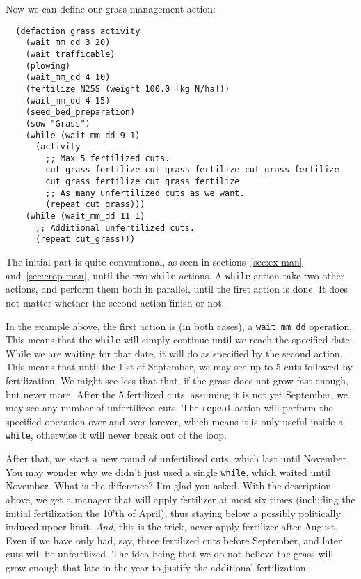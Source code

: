 \documentclass[a4paper,11pt]{article}
\begin{document}
Now we can define our grass management action:
\begin{verbatim}
  (defaction grass activity
    (wait_mm_dd 3 20)
    (wait trafficable)
    (plowing)
    (wait_mm_dd 4 10)
    (fertilize N25S (weight 100.0 [kg N/ha]))
    (wait_mm_dd 4 15)
    (seed_bed_preparation)
    (sow "Grass")
    (while (wait_mm_dd 9 1)
      (activity
        ;; Max 5 fertilized cuts.
        cut_grass_fertilize cut_grass_fertilize cut_grass_fertilize
        cut_grass_fertilize cut_grass_fertilize
        ;; As many unfertilized cuts as we want.
        (repeat cut_grass)))
    (while (wait_mm_dd 11 1)
      ;; Additional unfertilized cuts.
      (repeat cut_grass)))
\end{verbatim}
The initial part is quite conventional, as seen in
sections~\ref{sec:ex-man} and~\ref{sec:crop-man}, until the two
\texttt{while} actions.  A \texttt{while} action take two other
actions, and perform them both in parallel, until the first action is
done.  It does not matter whether the second action finish or not.

In the example above, the first action is (in both cases), a
\texttt{wait\_mm\_dd} operation.  This means that the \texttt{while}
will simply continue until we reach the specified date.  While we are
waiting for that date, it will do as specified by the second action.
This means that until the 1'st of September, we may see up to 5 cuts
followed by fertilization.  We might see less that that, if the grass
does not grow fast enough, but never more.  After the 5 fertilized
cuts, assuming it is not yet September, we may see any number of
unfertilized cuts.  The \texttt{repeat} action will perform the
specified operation over and over forever, which means it is only
useful inside a \texttt{while}, otherwise it will never break out of
the loop.

After that, we start a new round of unfertilized cuts, which last
until November.  You may wonder why we didn't just used a single
\texttt{while}, which waited until November.  What is the difference?
I'm glad you asked.  With the description above, we get a manager that
will apply fertilizer at most six times (including the initial
fertilization the 10'th of April), thus staying below a possibly
politically induced upper limit.  \emph{And}, this is the trick, never
apply fertilizer after August.  Even if we have only had, say, three
fertilized cuts before September, and later cuts will be unfertilized.
The idea being that we do not believe the grass will grow enough that
late in the year to justify the additional fertilization.
\end{document}
